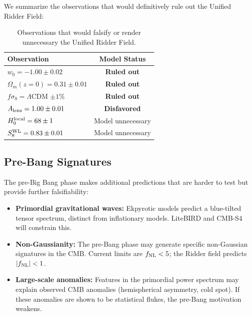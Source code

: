 \documentclass[twocolumn,showpacs,preprintnumbers,amsmath,amssymb,prd]{revtex4-2}
\begin{document}
We summarize the observations that would definitively rule out the Unified Ridder Field:

\begin{table}[h]
\centering
\begin{tabular}{lc}
\toprule
Observation & Model Status \\
\midrule
$w_0 = -1.00 \pm 0.02$ & \textbf{Ruled out} \\
$\Omega_m(z=0) = 0.31 \pm 0.01$ & \textbf{Ruled out} \\
$f\sigma_8 = \Lambda$CDM $\pm 1\%$ & \textbf{Ruled out} \\
$A_{\rm lens} = 1.00 \pm 0.01$ & \textbf{Disfavored} \\
$H_0^{\rm local} = 68 \pm 1$ & Model unnecessary \\
$S_8^{\rm WL} = 0.83 \pm 0.01$ & Model unnecessary \\
\bottomrule
\end{tabular}
\caption{Observations that would falsify or render unnecessary the Unified Ridder Field.}
\label{tab:falsify}
\end{table}

\subsection{Pre-Bang Signatures}

The pre-Big Bang phase makes additional predictions that are harder to test but provide further falsifiability:

\begin{itemize}
    \item \textbf{Primordial gravitational waves:} Ekpyrotic models predict a blue-tilted tensor spectrum, distinct from inflationary models. LiteBIRD and CMB-S4 will constrain this.
    
    \item \textbf{Non-Gaussianity:} The pre-Bang phase may generate specific non-Gaussian signatures in the CMB. Current limits are $f_{\rm NL} < 5$; the Ridder field predicts $|f_{\rm NL}| < 1$.
    
    \item \textbf{Large-scale anomalies:} Features in the primordial power spectrum may explain observed CMB anomalies (hemispherical asymmetry, cold spot). If these anomalies are shown to be statistical flukes, the pre-Bang motivation weakens.
\end{itemize}

\end{document}
